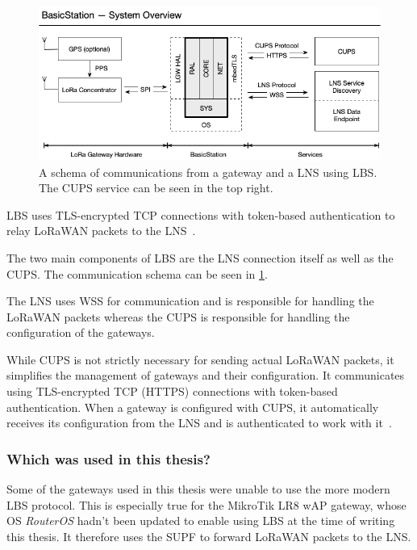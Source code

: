 \begin{figure}[htbp]
    \centering
    \includegraphics[width=1\textwidth]{pictures/lorawan-structure/lora-basics-station-structure.png}
    \caption{
        A schema of communications from a gateway and a \ac{LNS} using \acf{LBS}.
        The \ac{CUPS} service can be seen in the top right.~\protect\cite{semtech_lora_developer_portal_lora_2022}
    }\label{pic:lora-basics-station-schema}
\end{figure}

\ac{LBS} uses \ac{TLS}-encrypted \ac{TCP} connections with token-based authentication to relay \ac{LoRaWAN} packets to the \ac{LNS}~\cite{the_things_industries_bv_lora_2022}.

The two main components of \acl{LBS} are the \ac{LNS} connection itself as well as the \acf{CUPS}.
The communication schema can be seen in \cref{pic:lora-basics-station-schema}.

The \ac{LNS} uses \ac{WSS} for communication and is responsible for handling the \ac{LoRaWAN} packets whereas the \acl{CUPS} is responsible for handling the configuration of the gateways.

While \ac{CUPS} is not strictly necessary for sending actual \ac{LoRaWAN} packets, it simplifies the management of gateways and their configuration.
It communicates using \ac{TLS}-encrypted \ac{TCP} (\ac{HTTPS}) connections with token-based authentication.
When a gateway is configured with \ac{CUPS}, it automatically receives its configuration from the \ac{LNS} and is authenticated to work with it~\cite{the_things_industries_bv_lora_2022}.

\subsubsection{Which was used in this thesis?}

Some of the gateways used in this thesis were unable to use the more modern \ac{LBS} protocol.
This is especially true for the MikroTik LR8 wAP gateway, whose \ac{OS} \emph{RouterOS} hadn't been updated to enable using \ac{LBS} at the time of writing this thesis.
It therefore uses the \ac{SUPF} to forward \ac{LoRaWAN} packets to the \ac{LNS}.

